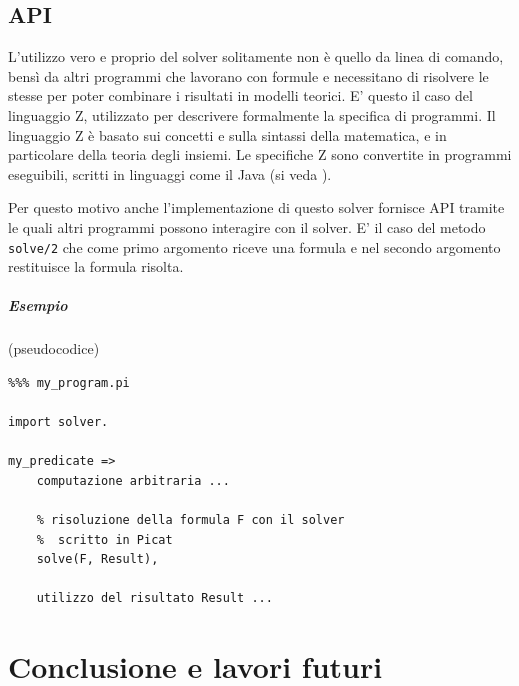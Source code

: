 \documentclass[12pt,a4paper,openright]{book} %
\begin{document}
\section{API}
\label{sec:use_api}

L'utilizzo vero e proprio del solver solitamente non è quello da linea
di comando, bensì da altri programmi che lavorano con formule e
necessitano di risolvere le stesse per poter combinare i risultati in
modelli teorici. E' questo il caso del linguaggio Z, utilizzato per
descrivere formalmente la specifica di programmi. Il linguaggio Z è
basato sui concetti e sulla sintassi della matematica, e in
particolare della teoria degli insiemi. Le specifiche Z sono
convertite in programmi eseguibili, scritti in linguaggi come il Java
(si veda \cite{DeSantis17}).

Per questo motivo anche l'implementazione di questo solver fornisce
API tramite le quali altri programmi possono interagire con il
solver. E' il caso del metodo \verb|solve/2| che come primo argomento
riceve una formula e nel secondo argomento restituisce la formula
risolta.

\paragraph{Esempio} (pseudocodice)
\begin{verbatim}
%%% my_program.pi

import solver.

my_predicate =>
    computazione arbitraria ...

    % risoluzione della formula F con il solver
    %  scritto in Picat
    solve(F, Result),

    utilizzo del risultato Result ...
\end{verbatim}



\chapter{Conclusione e lavori futuri}
\label{ch:conclusion}
\end{document}
